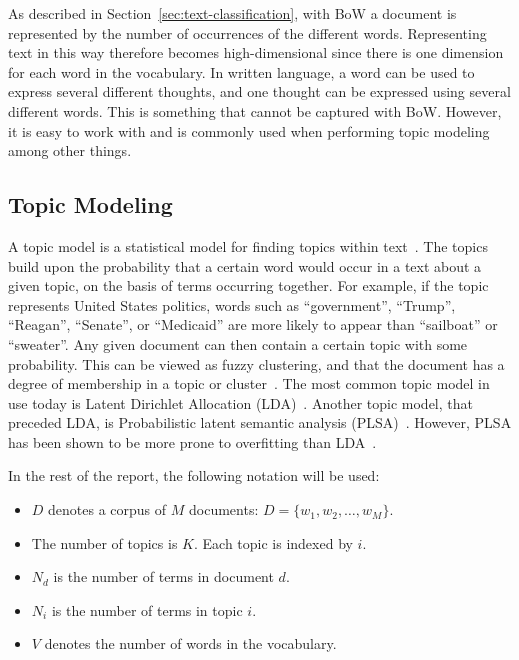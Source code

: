 As described in Section~\ref{sec:text-classification}, with BoW a document is represented by the number of occurrences of the different words. 
Representing text in this way therefore becomes high-dimensional since there is one dimension for each word in the vocabulary. 
In written language, a word can be used to express several different thoughts, and one thought can be expressed using several different words.
This is something that cannot be captured with BoW.
However, it is easy to work with and is commonly used when performing topic modeling among other things.

\subsection{Topic Modeling}\label{sec:topic-modeling}

A topic model is a statistical model for finding topics within text~\cite{crain2012dimensionality}.
The topics build upon the probability that a certain word would occur in a text about a given topic, on the basis of terms occurring together.
For example, if the topic represents United States politics, words such as ``government'', ``Trump'', ``Reagan'', ``Senate'', or ``Medicaid'' are more likely to appear than ``sailboat'' or ``sweater''.
Any given document can then contain a certain topic with some probability.
This can be viewed as fuzzy clustering, and that the document has a degree of membership in a topic or cluster~\cite{crain2012dimensionality}.
The most common topic model in use today is Latent Dirichlet Allocation (LDA)~\cite{crain2012dimensionality}.
Another topic model, that preceded LDA, is Probabilistic latent semantic analysis (PLSA)~\cite{hofmann1999probabilistic}.
However, PLSA has been shown to be more prone to overfitting than LDA~\cite{crain2012dimensionality}.

In the rest of the report, the following notation will be used:

\begin{itemize}
    \item $D$ denotes a corpus of $M$ documents: $D = \{w_1, w_2, \ldots, w_M\}$.
    \item The number of topics is $K$. Each topic is indexed by $i$.
    \item $N_d$ is the number of terms in document $d$.
    \item $N_i$ is the number of terms in topic $i$.
    \item $V$ denotes the number of words in the vocabulary.
\end{itemize}

